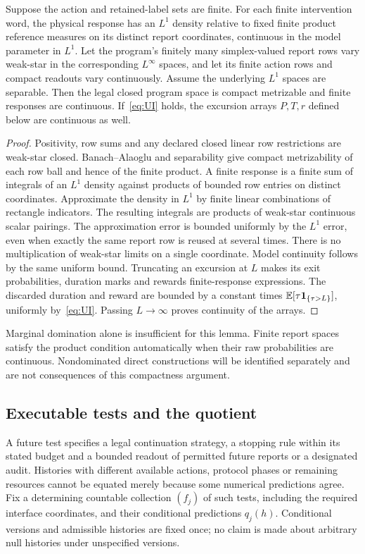 \begin{lemma}\label{lem:response}
Suppose the action and retained-label sets are finite. For each finite intervention word, the physical response has an $L^1$ density relative to fixed finite product reference measures on its distinct report coordinates, continuous in the model parameter in $L^1$. Let the program's finitely many simplex-valued report rows vary weak-star in the corresponding $L^\infty$ spaces, and let its finite action rows and compact readouts vary continuously. Assume the underlying $L^1$ spaces are separable. Then the legal closed program space is compact metrizable and finite responses are continuous. If~\eqref{eq:UI} holds, the excursion arrays $P,T,r$ defined below are continuous as well.
\end{lemma}
\begin{proof}
Positivity, row sums and any declared closed linear row restrictions are weak-star closed. Banach--Alaoglu and separability give compact metrizability of each row ball and hence of the finite product. A finite response is a finite sum of integrals of an $L^1$ density against products of bounded row entries on distinct coordinates. Approximate the density in $L^1$ by finite linear combinations of rectangle indicators. The resulting integrals are products of weak-star continuous scalar pairings. The approximation error is bounded uniformly by the $L^1$ error, even when exactly the same report row is reused at several times. There is no multiplication of weak-star limits on a single coordinate. Model continuity follows by the same uniform bound. Truncating an excursion at $L$ makes its exit probabilities, duration marks and rewards finite-response expressions. The discarded duration and reward are bounded by a constant times $\mathbb E[\tau\mathbf 1_{\{\tau>L\}}]$, uniformly by~\eqref{eq:UI}. Passing $L\to\infty$ proves continuity of the arrays.
\end{proof}
Marginal domination alone is insufficient for this lemma. Finite report spaces satisfy the product condition automatically when their raw probabilities are continuous. Nondominated direct constructions will be identified separately and are not consequences of this compactness argument.

\subsection{Executable tests and the quotient}
A future test specifies a legal continuation strategy, a stopping rule within its stated budget and a bounded readout of permitted future reports or a designated audit. Histories with different available actions, protocol phases or remaining resources cannot be equated merely because some numerical predictions agree. Fix a determining countable collection $(f_j)$ of such tests, including the required interface coordinates, and their conditional predictions $q_j(h)$. Conditional versions and admissible histories are fixed once; no claim is made about arbitrary null histories under unspecified versions.


